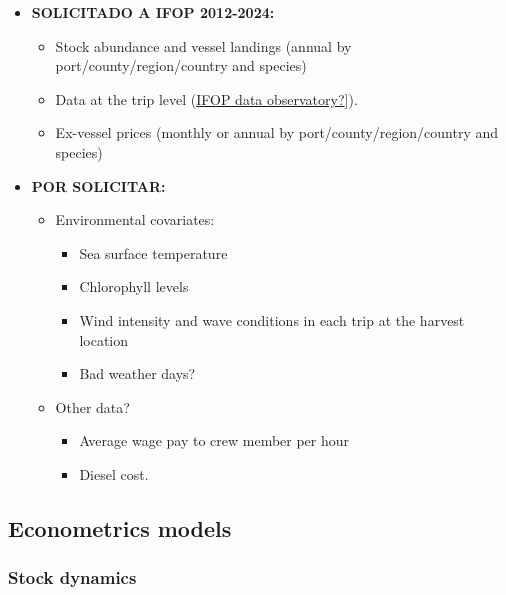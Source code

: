 \documentclass[
  11pt,
]{article}
\providecommand{\tightlist}{%
  \setlength{\itemsep}{0pt}\setlength{\parskip}{0pt}}
\begin{document}
\begin{itemize}
\tightlist
\item
  \textbf{SOLICITADO A IFOP 2012-2024:}

  \begin{itemize}
  \tightlist
  \item
    Stock abundance and vessel landings (annual by
    port/county/region/country and species)
  \item
    Data at the trip level (\href{ifop.dataobservatory.net}{IFOP data
    observatory?}{]}).
  \item
    Ex-vessel prices (monthly or annual by port/county/region/country
    and species)
  \end{itemize}
\item
  \textbf{POR SOLICITAR:}

  \begin{itemize}
  \tightlist
  \item
    Environmental covariates:

    \begin{itemize}
    \tightlist
    \item
      Sea surface temperature
    \item
      Chlorophyll levels
    \item
      Wind intensity and wave conditions in each trip at the harvest
      location
    \item
      Bad weather days?
    \end{itemize}
  \item
    Other data?

    \begin{itemize}
    \tightlist
    \item
      Average wage pay to crew member per hour
    \item
      Diesel cost.
    \end{itemize}
  \end{itemize}
\end{itemize}

\subsection{Econometrics models}\label{econometrics-models}

\subsubsection{Stock dynamics}\label{stock-dynamics}
\end{document}
